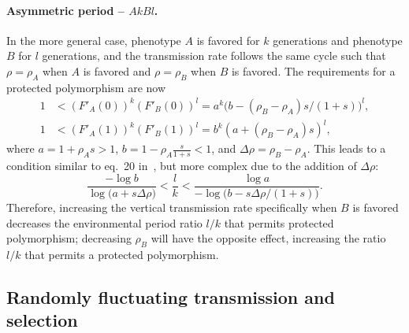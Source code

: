 \documentclass[11pt]{extarticle}
\begin{document}
\paragraph{Asymmetric period -- $AkBl$.}
In the more general case, phenotype $A$ is favored for $k$ generations and phenotype $B$ for $l$ generations, and the transmission rate follows the same cycle such that $\rho=\rho_A$ when $A$ is favored and $\rho=\rho_B$ when $B$ is favored.
The requirements for a protected polymorphism are now
\begin{equation}\begin{aligned}
1 &< (F'_A(0))^k (F'_B(0))^l = a^k \big(b - (\rho_B - \rho_A) s/(1+s)\big)^l,\\
1 &< (F'_A(1))^k (F'_B(1))^l = b^k (a + (\rho_B - \rho_A) s)^l,
\end{aligned}\end{equation}
where $a=1+\rho_A s>1$, $b=1-\rho_A\frac{s}{1+s}<1$, and $\Delta \rho = \rho_B - \rho_A$.
This leads to a condition similar to eq.~20 in~\citet{Ram2018}, but more complex due to the addition of $\Delta \rho$:
\begin{equation} \label{eq:poly_condition_periodic_fluc_k_l}
\frac{-\log{b}}{\log{\big(a + s \Delta \rho \big)}} < 
\frac{l}{k} < 
\frac{\log{a}}{-\log{\big(b - s \Delta \rho/(1+s)\big)}}.
\end{equation}
Therefore, increasing the vertical transmission rate specifically when $B$ is favored decreases the environmental period ratio $l/k$ that permits protected polymorphism; decreasing $\rho_B$  will have the opposite effect, increasing the ratio $l/k$ that permits a protected polymorphism.

\subsection*{Randomly fluctuating transmission and selection}
\end{document}
